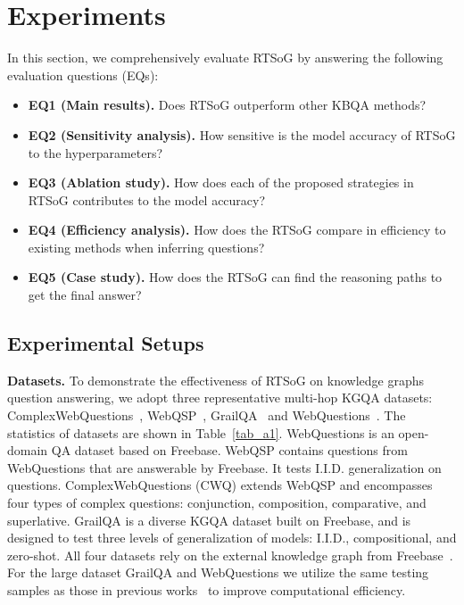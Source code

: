 \documentclass[lettersize,journal]{IEEEtran}
\begin{document}
\section{Experiments}
In this section, we comprehensively evaluate RTSoG by answering the following evaluation questions (EQs):
\begin{itemize}
\item \textbf{EQ1 (Main results).} Does RTSoG outperform other KBQA methods?
\item \textbf{EQ2 (Sensitivity analysis).} How sensitive is the model accuracy of RTSoG to the hyperparameters?
\item \textbf{EQ3 (Ablation study).} How does each of the proposed strategies in RTSoG contributes to the model accuracy?
\item \textbf{EQ4 (Efficiency analysis).} How does the RTSoG compare in efficiency to existing methods when inferring questions?
\item \textbf{EQ5 (Case study).} How does the RTSoG can find the reasoning paths to get the final answer?
\end{itemize}

\subsection{Experimental Setups}
\noindent \textbf{Datasets.} To demonstrate the effectiveness of RTSoG on knowledge graphs question answering, we adopt three representative multi-hop KGQA datasets: ComplexWebQuestions~\cite{talmor2018web}, WebQSP~\cite{yih2016value}, GrailQA~\cite{gu2021beyond} and WebQuestions~\cite{berant2013semantic}. The statistics of datasets are shown in Table~\ref{tab_a1}. WebQuestions is an open-domain QA dataset based on Freebase. WebQSP contains questions from WebQuestions that are answerable by Freebase. It tests I.I.D. generalization on questions. ComplexWebQuestions (CWQ) extends WebQSP and encompasses four types of complex questions: conjunction, composition, comparative, and superlative. GrailQA is a diverse KGQA dataset built on Freebase, and is designed to test three levels of generalization of models: I.I.D., compositional, and zero-shot. All four datasets rely on the external knowledge graph from Freebase~\cite{bollacker2008freebase}. For the large dataset GrailQA and WebQuestions we utilize the same testing samples as those in previous works~\cite{sun2023think, chen2024plan} to improve computational efficiency.
\end{document}

